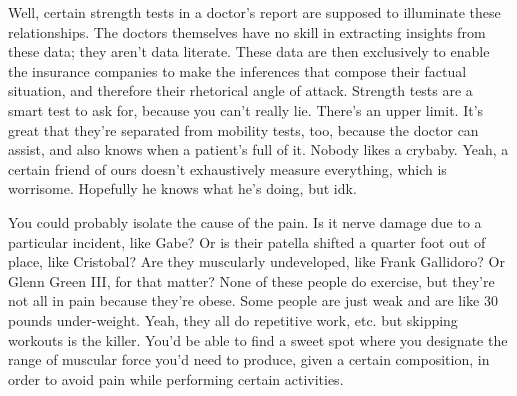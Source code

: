 \documentclass{article}
\begin{document}
Well, certain strength tests in a doctor's report are supposed to illuminate these relationships. The doctors themselves have no skill in extracting insights from these data; they aren't data literate. These data are then exclusively to enable the insurance companies to make the inferences that compose their factual situation, and therefore their rhetorical angle of attack. Strength tests are a smart test to ask for, because you can't really lie. There's an upper limit. It's great that they're separated from mobility tests, too, because the doctor can assist, and also knows when a patient's full of it. Nobody likes a crybaby. Yeah, a certain friend of ours doesn't exhaustively measure everything, which is worrisome. Hopefully he knows what he's doing, but idk. 

You could probably isolate the cause of the pain. Is it nerve damage due to a particular incident, like Gabe? Or is their patella shifted a quarter foot out of place, like Cristobal? Are they muscularly undeveloped, like Frank Gallidoro? Or Glenn Green III, for that matter? None of these people do exercise, but they're not all in pain because they're obese. Some people are just weak and are like 30 pounds under-weight. Yeah, they all do repetitive work, etc. but skipping workouts is the killer. You'd be able to find a sweet spot where you designate the range of muscular force you'd need to produce, given a certain composition, in order to avoid pain while performing certain activities.
\end{document}
